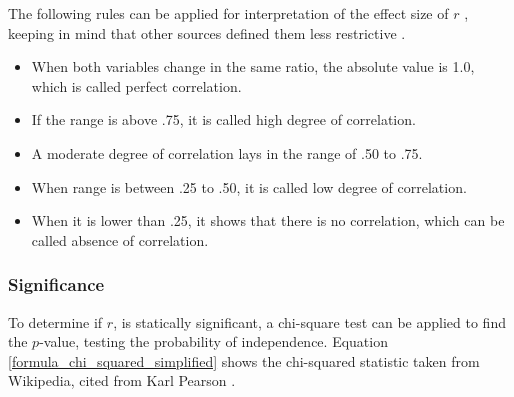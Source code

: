 \documentclass[a4paper,12pt]{report}
\begin{document}

The following rules can be applied for interpretation of the effect size of $r$ \cite{Wolfe2017}, keeping in mind that other sources defined them less restrictive \cite{Regber2016}.

\begin{itemize}
  \item When both variables change in the same ratio, the absolute value is 1.0, which is called perfect correlation.
  \item If the range is above .75, it is called high degree of correlation.
  \item A moderate degree of correlation lays in the range of .50 to .75.
  \item When range is between .25 to .50, it is called low degree of correlation.
  \item When it is lower than .25, it shows that there is no correlation, which can be called absence of correlation.
\end{itemize}	

\subsubsection{Significance}
To determine if $r$, is statically significant, a chi-square test can be applied to find the $p$-value, testing the probability of independence. Equation \ref{formula_chi_squared_simplified} shows the chi-squared statistic taken from Wikipedia, cited from Karl Pearson \cite{Pearson1990}.
\end{document}
